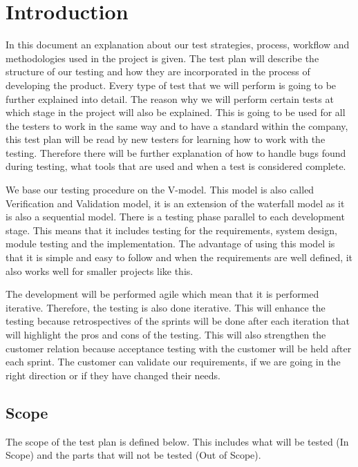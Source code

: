 \section{Introduction}
In this document an explanation about our test strategies, process, workflow and methodologies used in the project is given. The test plan will describe the structure of our testing and how they are incorporated in the process of developing the product. Every type of test that we will perform is going to be further explained into detail. The reason why we will perform certain tests at which stage in the project will also be explained. This is going to be used for all the testers to work in the same way and to have a standard within the company, this test plan will be read by new testers for learning how to work with the testing. Therefore there will be further explanation of how to handle bugs found during testing, what tools that are used and when a test is considered complete. \newline 

\noindent We base our testing procedure on the V-model. This model is also called Verification and Validation model, it is an extension of the waterfall model as it is also a sequential model. There is a testing phase parallel to each development stage. This means that it includes testing for the requirements, system design, module testing and the implementation. The advantage of using this model is that it is simple and easy to follow and when the requirements are well defined, it also works well for smaller projects like this.\newline

\noindent The development will be performed agile which mean that it is performed iterative. Therefore, the testing is also done iterative. This will enhance the testing because retrospectives of the sprints will be done after each iteration that will highlight the pros and cons of the testing. This will also strengthen the customer relation because acceptance testing with the customer will be held after each sprint. The customer can validate our requirements, if we are going in the right direction or if they have changed their needs. \newline

\subsection{Scope}
The scope of the test plan is defined below. This includes what will be tested (In Scope) and the parts that will not be tested (Out of Scope).  

